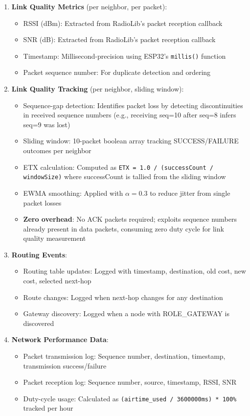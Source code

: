 \begin{enumerate}
\item \textbf{Link Quality Metrics} (per neighbor, per packet):
\begin{itemize}
\item RSSI (dBm): Extracted from RadioLib's packet reception callback
\item SNR (dB): Extracted from RadioLib's packet reception callback
\item Timestamp: Millisecond-precision using ESP32's \texttt{millis()} function
\item Packet sequence number: For duplicate detection and ordering
\end{itemize}

\item \textbf{Link Quality Tracking} (per neighbor, sliding window):
\begin{itemize}
\item Sequence-gap detection: Identifies packet loss by detecting discontinuities in received sequence numbers (e.g., receiving seq=10 after seq=8 infers seq=9 was lost)
\item Sliding window: 10-packet boolean array tracking SUCCESS/FAILURE outcomes per neighbor
\item ETX calculation: Computed as \texttt{ETX = 1.0 / (successCount / windowSize)} where successCount is tallied from the sliding window
\item EWMA smoothing: Applied with $\alpha=0.3$ to reduce jitter from single packet losses
\item \textbf{Zero overhead}: No ACK packets required; exploits sequence numbers already present in data packets, consuming zero duty cycle for link quality measurement
\end{itemize}

\item \textbf{Routing Events}:
\begin{itemize}
\item Routing table updates: Logged with timestamp, destination, old cost, new cost, selected next-hop
\item Route changes: Logged when next-hop changes for any destination
\item Gateway discovery: Logged when a node with ROLE\_GATEWAY is discovered
\end{itemize}

\item \textbf{Network Performance Data}:
\begin{itemize}
\item Packet transmission log: Sequence number, destination, timestamp, transmission success/failure
\item Packet reception log: Sequence number, source, timestamp, RSSI, SNR
\item Duty-cycle usage: Calculated as \texttt{(airtime\_used / 3600000ms) * 100\%} tracked per hour
\end{itemize}
\end{enumerate}


